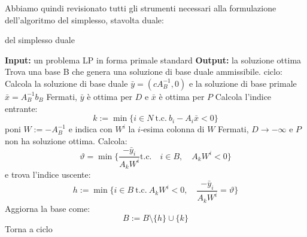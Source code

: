 \documentclass[a4paper,11pt]{article}
\begin{document}
Abbiamo quindi revisionato tutti gli strumenti necessari alla formulazione dell'algoritmo del simplesso, stavolta duale:
\begin{algorithm}[H]
\caption{del simplesso duale}
\begin{algorithmic}
	\STATE \textbf{Input:} un problema LP in forma primale standard
	\STATE \textbf{Output:} la soluzione ottima 
	\STATE Trova una base B che genera una soluzione di base duale ammissibile.
	\STATE \textsf{ciclo:}
	\STATE Calcola la soluzione di base duale $\bar{y} = (cA_B^{-1}, 0)$ e la soluzione di base primale $\bar{x} = A_B^{-1}b_B$
		\STATE Fermati, $\bar{y}$ è ottima per $D$ e $\bar{x}$ è ottima per $P$
	\ELSE
		\STATE Calcola l'indice entrante: 
		$$
		k := \min\{ i \in N \ \text{t.c.} \ b_i - A_i \bar{x} < 0 \}
		$$
		poni $W := -A_B^{-1}$ e indica con $W^i$ la $i$-esima colonna di $W$
	\ENDIF
		\STATE Fermati, $D \rightarrow -\infty$ e $P$ non ha soluzione ottima.
	\ELSE
		\STATE Calcola:
		$$
		\vartheta = \min\{ \frac{-\bar{y}_i}{A_kW^i} \text{t.c.} \quad i \in B, \quad A_k W^i < 0 \}
		$$
		e trova l'indice uscente: 
		$$ 
		h := \min\{ i \in B \ \text{t.c.} \ A_k W^i < 0, \quad \frac{-\bar{y}_i}{A_kW^i} = \vartheta \}	
		$$
	\ENDIF
	\STATE Aggiorna la base come:
	$$
	B := B \setminus \{h\} \cup \{k\}
	$$
	\STATE Torna a \textsf{ciclo}
\end{algorithmic}
\end{algorithm}
\end{document}
